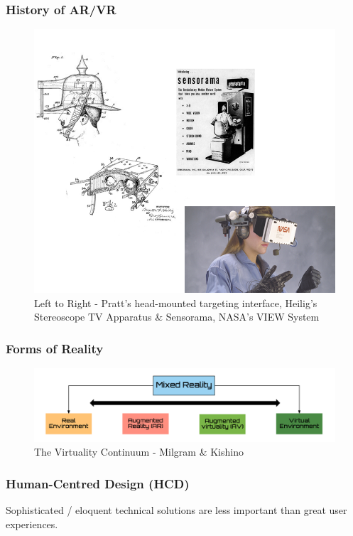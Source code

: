 \begin{frame}
	\frametitle{History of AR/VR}
	\begin{figure}
		\includegraphics[scale=.5]{assets/history.png}
		\caption{\tiny{Left to Right - Pratt's head-mounted targeting interface, Heilig's Stereoscope TV Apparatus \& Sensorama, NASA's VIEW System} }
	\end{figure}
\end{frame}

\begin{frame}
	\frametitle{Forms of Reality}
	\begin{figure}
		\includegraphics[scale=.2]{assets/continuum.png}
		\caption{The Virtuality Continuum - Milgram \& Kishino}
	\end{figure}
\end{frame}




\begin{frame}
	\frametitle{Human-Centred Design (HCD)}
	
	Sophisticated / eloquent technical solutions are less important than great user experiences.
\end{frame}

